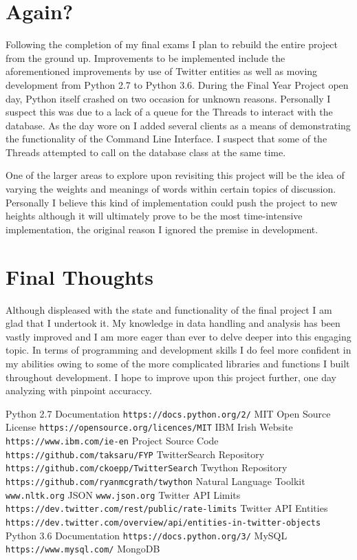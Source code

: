 \documentclass[12pt,a4paper]{report}
\begin{document}
  \section{Again?}
    Following the completion of my final exams I plan to rebuild the entire project from the ground up. Improvements to be implemented include the aforementioned improvements by use of Twitter entities\cite{TwitterEntities} as well as moving development from Python 2.7 to Python 3.6. During the Final Year Project open day, Python itself crashed on two occasion for unknown reasons. Personally I suspect this was due to a lack of a queue for the Threads to interact with the database. As the day wore on I added several clients as a means of demonstrating the functionality of the Command Line Interface. I suspect that some of the Threads attempted to call on the database class at the same time. 
    \par
    One of the larger areas to explore upon revisiting this project will be the idea of varying the weights and meanings of words within certain topics of discussion. Personally I believe this kind of implementation could push the project to new heights although it will ultimately prove to be the most time-intensive implementation, the original reason I ignored the premise in development.
  \section{Final Thoughts}
    Although displeased with the state and functionality of the final project I am glad that I undertook it. My knowledge in data handling and analysis has been vastly improved and I am more eager than ever to delve deeper into this engaging topic. In terms of programming and development skills I do feel more confident in my abilities owing to some of the more complicated libraries and functions I built throughout development. I hope to improve upon this project further, one day analyzing with pinpoint accuraccy.


\begin{thebibliography}{12}
Python 2.7 Documentation
\texttt{https://docs.python.org/2/}
MIT Open Source License
\texttt{https://opensource.org/licences/MIT}
IBM Irish Website
\texttt{https://www.ibm.com/ie-en}
Project Source Code
\texttt{https://github.com/taksaru/FYP}
TwitterSearch Repository
\texttt{https://github.com/ckoepp/TwitterSearch}
Twython Repository
\texttt{https://github.com/ryanmcgrath/twython}
Natural Language Toolkit
\texttt{www.nltk.org}
JSON 
\texttt{www.json.org}
Twitter API Limits
\texttt{https://dev.twitter.com/rest/public/rate-limits}
Twitter API Entities
\texttt{https://dev.twitter.com/overview/api/entities-in-twitter-objects}
Python 3.6 Documentation
\texttt{https://docs.python.org/3/}
MySQL 
\texttt{https://www.mysql.com/}
MongoDB
\end{thebibliography}
\end{document}
